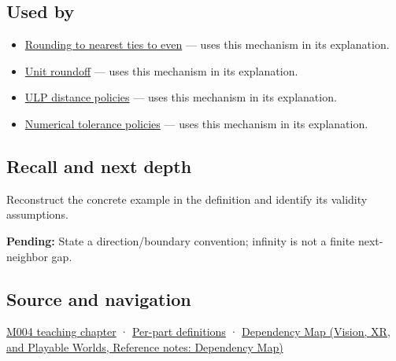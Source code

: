 \subsection{Used by}\label{appendix-14bab4cab9d4-used-by}

\hypertarget{appendix-14bab4cab9d4-used-by}{}

\begin{itemize}
\tightlist
\item
  \hyperref[appendix-614afe1de592]{Rounding to nearest ties to even} --- uses this mechanism in its explanation.
\item
  \hyperref[appendix-bc44f7b42f42]{Unit roundoff} --- uses this mechanism in its explanation.
\item
  \hyperref[appendix-deca299ae4b8]{ULP distance policies} --- uses this mechanism in its explanation.
\item
  \hyperref[appendix-0ec599f8ba27]{Numerical tolerance policies} --- uses this mechanism in its explanation.
\end{itemize}

\subsection{Recall and next depth}\label{appendix-14bab4cab9d4-recall-and-next-depth}

\hypertarget{appendix-14bab4cab9d4-recall-and-next-depth}{}

Reconstruct the concrete example in the definition and identify its validity assumptions.

\textbf{Pending:} State a direction/boundary convention; infinity is not a finite next-neighbor gap.

\subsection{Source and navigation}\label{appendix-14bab4cab9d4-source-and-navigation}

\hypertarget{appendix-14bab4cab9d4-source-and-navigation}{}

\hyperref[01-foundations-i-ch001-a-stretching-ruler-for-real-valued-quantities]{M004 teaching chapter} · \hyperref[appendix-fd090d982a15-m004---parts-61-76]{Per-part definitions} · \href{../07-Vision-XR-and-Playable-Worlds/main.pdf\#nameddest=appendix-4ad47bdd269a}{Dependency Map (Vision, XR, and Playable Worlds, Reference notes: Dependency Map)}
